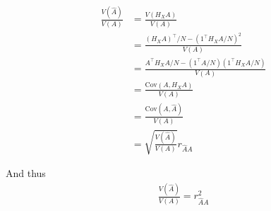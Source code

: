 \documentclass[40pt]{article}
\begin{document}
\begin{align*}
    \frac{V(\hat{A})}{V(A)} &= \frac{V(H_XA)}{V(A)} \\
    &= \frac{(H_XA)^{\top}/N - (1^{\top}H_XA/N)^2}{V(A)} \\
    &= \frac{A^{\top}H_XA/N - (1^{\top}A/N)(1^{\top}H_XA/N)}{V(A)} \\
    &= \frac{\text{Cov}(A, H_XA)}{V(A)} \\
    &= \frac{\text{Cov}(A,\hat{A})}{V(A)} \\
    &= \sqrt{\frac{V(\hat{A})}{V(A)}} r_{\hat{A}A}
\end{align*}
    
And thus
\begin{align*}
     \frac{V(\hat{A})}{V(A)} 
    = r_{\hat{A}A}^2
\end{align*}




\end{document}
